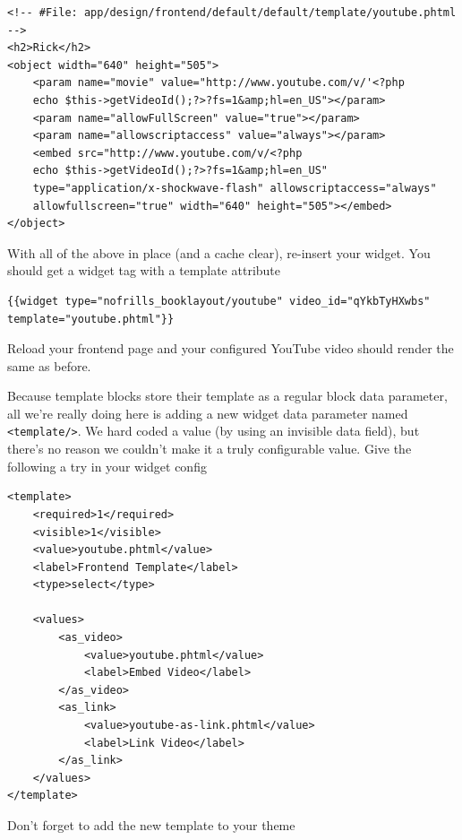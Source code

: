 \documentclass[oneside]{book}
\begin{document}
\begin{lstlisting}
<!-- #File: app/design/frontend/default/default/template/youtube.phtml -->
<h2>Rick</h2>
<object width="640" height="505">
    <param name="movie" value="http://www.youtube.com/v/'<?php 
    echo $this->getVideoId();?>?fs=1&amp;hl=en_US"></param>
    <param name="allowFullScreen" value="true"></param>
    <param name="allowscriptaccess" value="always"></param>
    <embed src="http://www.youtube.com/v/<?php 
    echo $this->getVideoId();?>?fs=1&amp;hl=en_US"
    type="application/x-shockwave-flash" allowscriptaccess="always" 
    allowfullscreen="true" width="640" height="505"></embed>
</object>   

\end{lstlisting}


With all of the above in place (and a cache clear), re-insert your widget.  You should get a widget tag with a template attribute

\begin{lstlisting}
{{widget type="nofrills_booklayout/youtube" video_id="qYkbTyHXwbs"
template="youtube.phtml"}}

\end{lstlisting}


Reload your frontend page and your configured YouTube video should render the same as before.

Because template blocks store their template as a regular block data parameter, all we're really doing here is adding a new widget data parameter named \footnotesize\texttt{\textless template/\textgreater }\normalsize.  We hard coded a value (by using an invisible data field), but there's no reason we couldn't make it a truly configurable value.  Give the following a try in your widget config

\begin{lstlisting}
<template>
    <required>1</required>
    <visible>1</visible>
    <value>youtube.phtml</value>
    <label>Frontend Template</label>
    <type>select</type>

    <values>
        <as_video>
            <value>youtube.phtml</value>
            <label>Embed Video</label>
        </as_video> 
        <as_link>
            <value>youtube-as-link.phtml</value>
            <label>Link Video</label>                                           
        </as_link>
    </values>
</template> 

\end{lstlisting}


Don't forget to add the new template to your theme  
\end{document}
